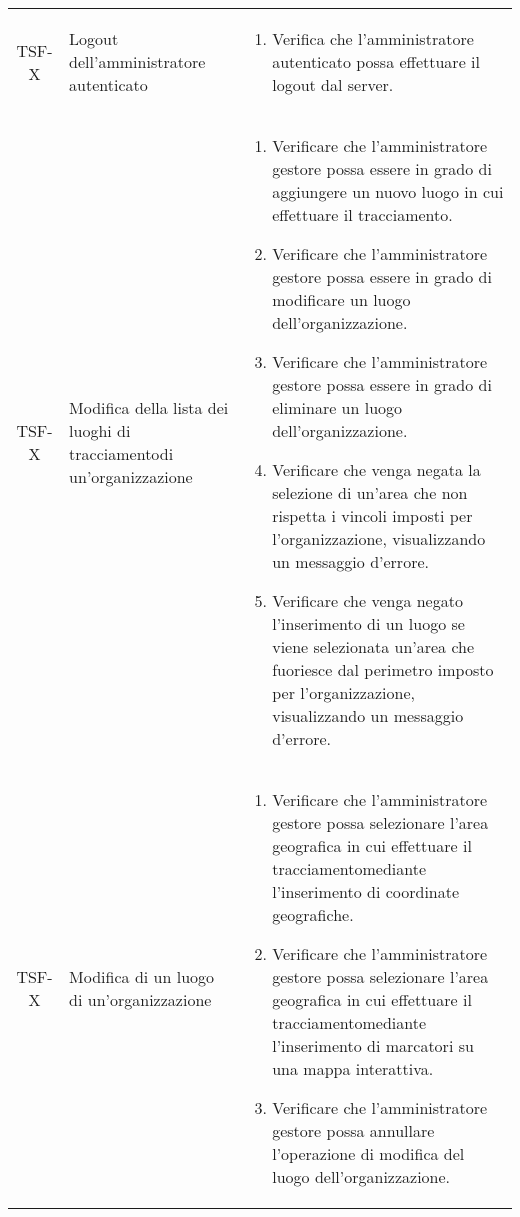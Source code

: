{\begin{longtable}{ c | C{3cm} | C{11cm} }
TSF-X & Logout dell'amministratore autenticato & \begin{enumerate}
    \item Verifica che l'amministratore autenticato possa effettuare il logout dal server.
\end{enumerate} \\

TSF-X & Modifica della lista dei luoghi di tracciamentodi un'organizzazione & \begin{enumerate}
    \item Verificare che l'amministratore gestore possa essere in grado di aggiungere un nuovo luogo in cui effettuare il tracciamento.
    \item Verificare che l'amministratore gestore possa essere in grado di modificare un luogo dell'organizzazione.
    \item Verificare che l'amministratore gestore possa essere in grado di eliminare un luogo dell'organizzazione.
    \item Verificare che venga negata la selezione di un'area che non rispetta i vincoli imposti per l'organizzazione, visualizzando un messaggio d'errore.
    \item Verificare che venga negato l'inserimento di un luogo se viene selezionata un'area che fuoriesce dal perimetro imposto per l'organizzazione, visualizzando un messaggio d'errore.
\end{enumerate} \\

TSF-X & Modifica di un luogo di un'organizzazione & \begin{enumerate}
    \item Verificare che l'amministratore gestore possa selezionare l'area geografica in cui effettuare il tracciamentomediante l'inserimento di coordinate geografiche.
    \item Verificare che l'amministratore gestore possa selezionare l'area geografica in cui effettuare il tracciamentomediante l'inserimento di marcatori su una mappa interattiva.
    \item Verificare che l'amministratore gestore possa annullare l'operazione di modifica del luogo dell'organizzazione.
\end{enumerate} \\


\end{longtable}}
